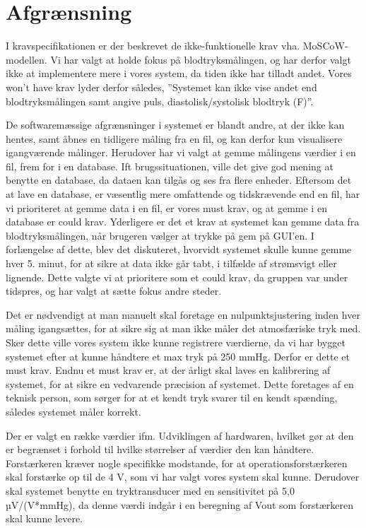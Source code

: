 \section{Afgrænsning}
I kravspecifikationen er der beskrevet de ikke-funktionelle krav vha. MoSCoW- modellen. Vi har valgt at holde fokus på blodtryksmålingen, og har derfor valgt ikke at implementere mere i vores system, da tiden ikke har tilladt andet. Vores won’t have krav lyder derfor således, ”Systemet kan ikke vise andet end blodtryksmålingen samt angive puls, diastolisk/systolisk blodtryk (F)”.

De softwaremæssige afgrænsninger i systemet er blandt andre, at der ikke kan hentes, samt åbnes en tidligere måling fra en fil, og kan derfor kun visualisere igangværende målinger. Herudover har vi valgt at gemme målingens værdier i en fil, frem for i en database. Ift brugssituationen, ville det give god mening at benytte en database, da dataen kan tilgås og ses fra flere enheder. Eftersom det at lave en database, er væsentlig mere omfattende og tidskrævende end en fil, har vi prioriteret at gemme data i en fil, er vores must krav, og at gemme i en database er could krav. Yderligere er det et krav at systemet kan gemme data fra blodtryksmålingen, når brugeren vælger at trykke på gem på GUI’en. I forlængelse af dette, blev det diskuteret, hvorvidt systemet skulle kunne gemme hver 5. minut, for at sikre at data ikke går tabt, i tilfælde af strømsvigt eller lignende. Dette valgte vi at prioritere som et could krav, da gruppen var under tidspres, og har valgt at sætte fokus andre steder. 

Det er nødvendigt at man manuelt skal foretage en nulpunktsjustering inden hver måling igangsættes, for at sikre sig at man ikke måler det atmosfæriske tryk med. Sker dette ville vores system ikke kunne registrere værdierne, da vi har bygget systemet efter at kunne håndtere et max tryk på 250 mmHg. Derfor er dette et must krav. Endnu et must krav er, at der årligt skal laves en kalibrering af systemet, for at sikre en vedvarende præcision af systemet. Dette foretages af en teknisk person, som sørger for at et kendt tryk svarer til en kendt spænding, således systemet måler korrekt.

Der er valgt en række værdier ifm. Udviklingen af hardwaren, hvilket gør at den er begrænset i forhold til hvilke størrelser af værdier den kan håndtere. Forstærkeren kræver nogle specifikke modstande, for at operationsforstærkeren skal forstærke op til de 4 V, som vi har valgt vores system skal kunne. Derudover skal systemet benytte en tryktransducer med en sensitivitet på 5,0 µV/(V*mmHg), da denne værdi indgår i en beregning af Vout som forstærkeren skal kunne levere.


